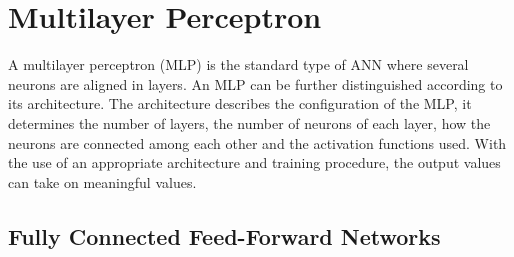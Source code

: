 \section{Multilayer Perceptron}\label{sec:ch_4_mlp}

A multilayer perceptron (MLP) is the standard type of ANN where several neurons are aligned in layers. An MLP can be further distinguished according to its architecture. The architecture describes the configuration of the MLP, it determines the number of layers, the number of neurons of each layer, how the neurons are connected among each other and the activation functions used. With the use of an appropriate architecture and training procedure, the output values can take on meaningful values. 

\subsection{Fully Connected Feed-Forward Networks}


